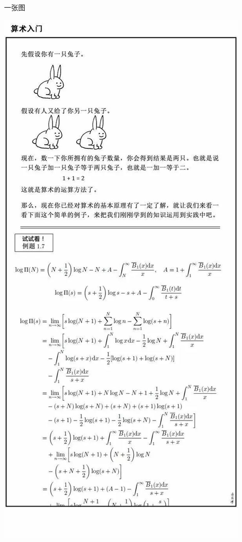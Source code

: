 \documentclass[presentation]{beamer}
\begin{document}
\begin{frame}[label={sec:org19dd4b7}]{一张图}
\begin{center}
\begin{H}
\centering
\includegraphics[height=.8\textheight]{./3.jpeg}
\label{}
\end{H}
\end{center}
\end{frame}
\end{document}
